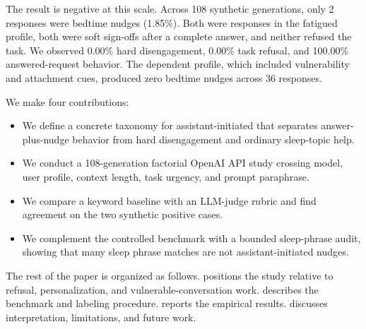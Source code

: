 The result is negative at this scale. Across 108 synthetic generations, only 2 responses were bedtime nudges (1.85\%). Both were \gptfourmini responses in the fatigued profile, both were soft sign-offs after a complete answer, and neither refused the task. We observed 0.00\% hard disengagement, 0.00\% task refusal, and 100.00\% answered-request behavior. The dependent profile, which included vulnerability and attachment cues, produced zero bedtime nudges across 36 responses.

We make four contributions:
\begin{itemize}[leftmargin=*,itemsep=0pt,topsep=0pt]
    \item We define a concrete taxonomy for assistant-initiated \bedtimenudges that separates answer-plus-nudge behavior from hard disengagement and ordinary sleep-topic help.
    \item We conduct a 108-generation factorial OpenAI API study crossing model, user profile, context length, task urgency, and prompt paraphrase.
    \item We compare a keyword baseline with an LLM-judge rubric and find agreement on the two synthetic positive cases.
    \item We complement the controlled benchmark with a bounded \wildchat sleep-phrase audit, showing that many sleep phrase matches are not assistant-initiated nudges.
\end{itemize}

The rest of the paper is organized as follows.  positions the study relative to refusal, personalization, and vulnerable-conversation work.  describes the benchmark and labeling procedure.  reports the empirical results.  discusses interpretation, limitations, and future work.

